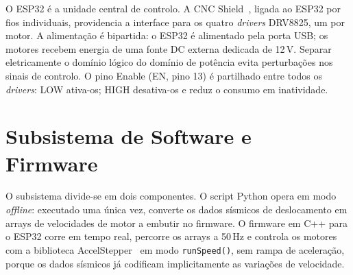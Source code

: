 O ESP32 é a unidade central de controlo. A CNC Shield~\cite{JoyITCNCKit2}, ligada ao ESP32 por fios individuais, providencia a interface para os quatro \textit{drivers} DRV8825, um por motor. A alimentação é bipartida: o ESP32 é alimentado pela porta USB; os motores recebem energia de uma fonte DC externa dedicada de 12\,V. Separar eletricamente o domínio lógico do domínio de potência evita perturbações nos sinais de controlo. O pino Enable (EN, pino 13) é partilhado entre todos os \textit{drivers}: LOW ativa-os; HIGH desativa-os e reduz o consumo em inatividade.

\section{Subsistema de Software e Firmware}
\label{sec:subsistema-software}

O subsistema divide-se em dois componentes. O script Python opera em modo \textit{offline}: executado uma única vez, converte os dados sísmicos de deslocamento em arrays de velocidades de motor a embutir no firmware. O firmware em C++ para o ESP32 corre em tempo real, percorre os arrays a 50\,Hz e controla os motores com a biblioteca AccelStepper~\cite{AccelStepper} em modo \texttt{runSpeed()}, sem rampa de aceleração, porque os dados sísmicos já codificam implicitamente as variações de velocidade.
